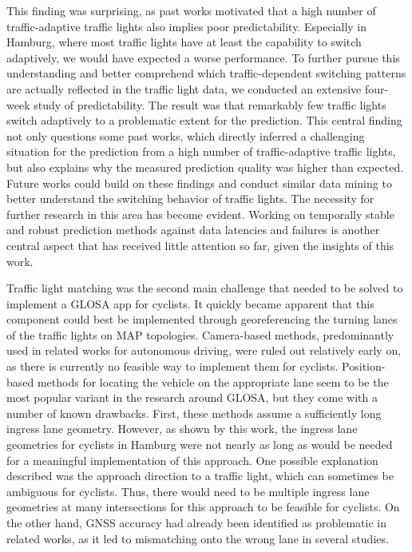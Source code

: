 This finding was surprising, as past works motivated that a high number of traffic-adaptive traffic lights also implies poor predictability. Especially in Hamburg, where most traffic lights have at least the capability to switch adaptively, we would have expected a worse performance. To further pursue this understanding and better comprehend which traffic-dependent switching patterns are actually reflected in the traffic light data, we conducted an extensive four-week study of predictability. The result was that remarkably few traffic lights switch adaptively to a problematic extent for the prediction. This central finding not only questions some past works, which directly inferred a challenging situation for the prediction from a high number of traffic-adaptive traffic lights, but also explains why the measured prediction quality was higher than expected. Future works could build on these findings and conduct similar data mining to better understand the switching behavior of traffic lights. The necessity for further research in this area has become evident. Working on temporally stable and robust prediction methods against data latencies and failures is another central aspect that has received little attention so far, given the insights of this work.

Traffic light matching was the second main challenge that needed to be solved to implement a GLOSA app for cyclists. It quickly became apparent that this component could best be implemented through georeferencing the turning lanes of the traffic lights on MAP topologies. Camera-based methods, predominantly used in related works for autonomous driving, were ruled out relatively early on, as there is currently no feasible way to implement them for cyclists. Position-based methods for locating the vehicle on the appropriate lane seem to be the most popular variant in the research around GLOSA, but they come with a number of known drawbacks. First, these methods assume a sufficiently long ingress lane geometry. However, as shown by this work, the ingress lane geometries for cyclists in Hamburg were not nearly as long as would be needed for a meaningful implementation of this approach. One possible explanation described was the approach direction to a traffic light, which can sometimes be ambiguous for cyclists. Thus, there would need to be multiple ingress lane geometries at many intersections for this approach to be feasible for cyclists. On the other hand, GNSS accuracy had already been identified as problematic in related works, as it led to mismatching onto the wrong lane in several studies.

